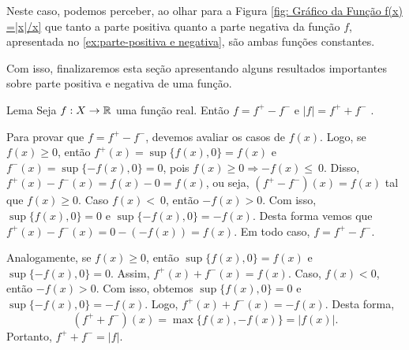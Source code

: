 Neste caso, podemos perceber, ao olhar para a Figura \ref{fig: Gráfico da Função f(x) =|x|/x} que tanto a parte positiva quanto a parte negativa da função $f$, apresentada no \ref{ex:parte-positiva e negativa}, são ambas funções constantes.

    \begin{figure}[h!]
	\centering
    \end{figure}    

Com isso, finalizaremos esta seção apresentando alguns resultados importantes sobre parte positiva e negativa de uma função.
    \begin{env}{Lema}
    \label{lem:f = f^+ - f^-}
        Seja $f: X \to \mathbb{R}$ uma função real. Então $f = f^+ - f^-$ e $|f| = f^+ + f^-$ \cite{bartle}.
    \end{env}
    \begin{prova}
            Para provar que $f = f^+ - f^-$, devemos avaliar os casos de $f(x)$. 
            Logo, se $f(x) \geq 0$, então $f^+(x) = \sup\{f(x), 0\} = f(x)$ e $f^-(x) = \sup\{-f(x), 0\} = 0$, pois $f(x) \geq 0 \Rightarrow  - f(x) \leq~0$.
            Disso, $f^+(x) - f^-(x) = f(x) - 0 = f(x)$, ou seja, $(f^+ - f^-)(x) = f(x)$ tal que $f(x) \geq 0$.
            Caso $f(x) <~0$, então $- f(x) > 0$. 
            Com isso,  $\sup\{f(x), 0\} = 0$ e $\sup\{-f(x), 0\} = -f(x)$.
            Desta forma vemos que
            $f^+(x) - f^-(x) = 0 - (-f(x)) = f(x)$.
            Em todo caso, $f = f^+ - f^-$.

            Analogamente, se $f(x) \geq 0$, então  $\sup\{f(x), 0\} = f(x)$ e $\sup\{-f(x), 0\} = 0$.
            Assim, $f^+(x) + f^-(x) = f(x)$.
            Caso, $f(x) < 0$, então $ - f(x) > 0$.
            Com isso, obtemos $\sup\{f(x), 0\} = 0$ e $\sup\{-f(x), 0\} = -f(x)$.
            Logo, $f^+(x) + f^-(x) = -f(x)$.
            Desta forma, 
            $$
            (f^+ + f^-)(x) = \max\{f(x), -f(x)\} = |f(x)|.
            $$
            Portanto, $f^+ + f^- = |f|$.
    \end{prova}

